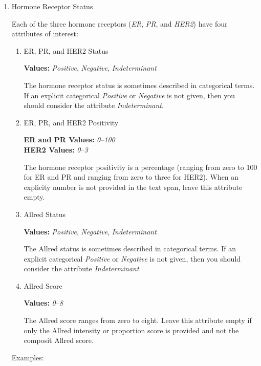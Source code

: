 \documentclass[letterpaper]{article}
\newcommand{\prefixDeep}[3]{%
  #1 %
  \tikz[baseline={([yshift={-\ht\strutbox}]a\x.north)},outer sep=0pt,inner sep=0pt]{%
    \node[align=center] (a\x) {%
      \strut \hl{#2}};%
  } %
  #3
}
\newcommand{\suffixDeep}{%
  \tikz[overlay]{ \draw[<->,thick] (b\x.west) -| (a\x.south); }%
  \pgfmathparse{int(\x+1)}%
  \xdef\x{\pgfmathresult}%
}
\newcommand{\fiveDeep}[9]{%
  \begin{flushright}
  \tikz{
    \node[attrbox,align=right] (b\x) {%
      #1:  #2\\%
      #3:  #4\\%
      #5:  #6\\%
      #7:  #8\\%
      Historical:  #9%
    };%
  }
  \end{flushright}
  \suffixDeep
}
\newcommand{\erStatus}[5]{\fiveDeep{ER Status}{#1}{ER Positivity}{#2}{Allred Status}{#3}{Allred Score}{#4}{#5}}
\begin{document}
\begin{enumerate}
\item
  Hormone Receptor Status

  Each of the three hormone receptors (\textsl{ER}, \textsl{PR}, and \textsl{HER2}) have four attributes of interest:
  \begin{enumerate}
  \item
    ER, PR, and HER2 Status

    \textbf{Values:}  \textsl{Positive}, \textsl{Negative}, \textsl{Indeterminant}

    The hormone receptor status is sometimes described in categorical terms.
    If an explicit categorical \textsl{Positive} or \textsl{Negative} is not given, then you should consider the attribute \textsl{Indeterminant}.
    
  \item
    ER, PR, and HER2 Positivity

    \textbf{ER and PR Values:}  \textsl{0}--\textsl{100} \\
    \textbf{HER2 Values:}  \textsl{0}--\textsl{3}

    The hormone receptor positivity is a percentage (ranging from zero to 100 for ER and PR and ranging from zero to three for HER2).
    When an explicity number is not provided in the text span, leave this attribute empty.
    
  \item
    Allred Status

    \textbf{Values:}  \textsl{Positive}, \textsl{Negative}, \textsl{Indeterminant}

    The Allred status is sometimes described in categorical terms.
    If an explicit categorical \textsl{Positive} or \textsl{Negative} is not given, then you should consider the attribute \textsl{Indeterminant}.
    
  \item
    Allred Score

    \textbf{Values:}  \textsl{0}--\textsl{8}
    
    The Allred score ranges from zero to eight.
    Leave this attribute empty if only the Allred intensity or proportion score is provided and not the composit Allred score.
    
  \end{enumerate}

  Examples:
\end{enumerate}
\end{document}
